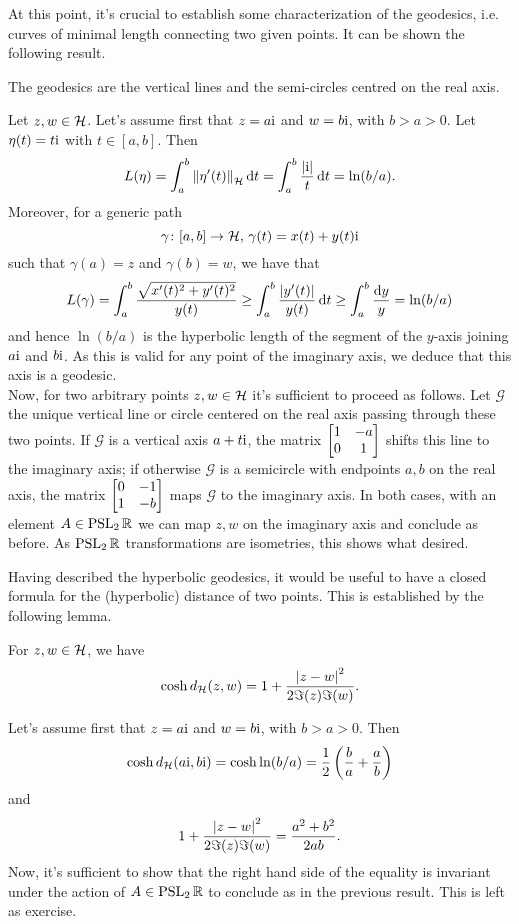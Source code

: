 At this point, it's crucial to establish some characterization of the geodesics, i.e. curves of minimal length connecting two given points. It can be shown the following result.

\begin{nprop}
\label{prop:geod_hyp}
The geodesics are the vertical lines and the semi-circles centred on the real axis.
\end{nprop}
\begin{prf}
Let $z,w\in\mathcal{H}$. Let's assume first that $z=a\mathrm{i}$ and $w=b\mathrm{i}$, with $b>a>0$. Let $\eta(t)=t\mathrm{i}$ with $t\in[a,b]$. Then 
\[
L(\eta)=\int_{a}^{b}\left\lVert \eta'(t)\right\rVert_{\mathcal{H}}\mathop{}\!\mathrm{d} t=\int_{a}^{b}\frac{\left| \mathrm{i}\right|}{t}\mathop{}\!\mathrm{d} t=\ln(b/a).
\]
Moreover, for a generic path 
\[
\gamma\colon[a,b]\to\mathcal{H},\,\gamma(t)=x(t)+y(t)\mathrm{i}
\] 
such that $\gamma(a)=z$ and $\gamma(b)=w$, we have that
\[
L(\gamma)=\int_{a}^{b}\frac{\sqrt{x'(t)^{2}+y'(t)^{2}}}{y(t)}\geq\int_{a}^{b}\frac{\left| y'(t)\right|}{y(t)}\mathop{}\!\mathrm{d} t\geq\int_{a}^{b}\frac{\mathop{}\!\mathrm{d} y}{y}=\ln(b/a)
\]
and hence $\ln(b/a)$ is the hyperbolic length of the segment of the $y$-axis joining $a\mathrm{i}$ and $b\mathrm{i}$. As this is valid for any point of the imaginary axis, we deduce that this axis is a geodesic.\\
Now, for two arbitrary points $z,w\in\mathcal{H}$ it's sufficient to proceed as follows. Let $\mathcal{G}$ the unique vertical line or circle centered on the real axis passing through these two points. If $\mathcal{G}$ is a vertical axis $a+t\mathrm{i}$, the matrix $\begin{bmatrix} 1&-a\\0&1 \end{bmatrix}$ shifts this line to the imaginary axis; if otherwise $\mathcal{G}$ is a semicircle with endpoints $a,b$ on the real axis, the matrix $\begin{bmatrix} 0&-1\\1&-b \end{bmatrix}$ maps $\mathcal{G}$ to the imaginary axis. In both cases, with an element $A\in\operatorname{PSL}_{2}\mathbb{R}$ we can map $z,w$ on the imaginary axis and conclude as before. As $\operatorname{PSL}_{2}\mathbb{R}$ transformations are isometries, this shows what desired.
\end{prf}

Having described the hyperbolic geodesics, it would be useful to have a closed formula for the (hyperbolic) distance of two points. This is established by the following lemma.
\begin{nlem}
\label{lem:hyp_distance_formula}
For $z,w\in\mathcal{H}$, we have 
\[
\cosh d_{\mathcal{H}}(z,w)=1+\frac{\left| z-w\right|^{2}}{2\Im(z)\Im(w)}.
\]
\end{nlem}
\begin{prf}
Let's assume first that $z=a\mathrm{i}$ and $w=b\mathrm{i}$, with $b>a>0$. Then 
\[
\cosh d_{\mathcal{H}}(a\mathrm{i},b\mathrm{i})=\cosh\ln(b/a)=\frac{1}{2}\left(\frac{b}{a}+\frac{a}{b}\right)
\]
and 
\[
1+\frac{\left| z-w\right|^{2}}{2\Im(z)\Im(w)}=\frac{a^{2}+b^{2}}{2ab}.
\]
Now, it's sufficient to show that the right hand side of the equality is invariant under the action of $A\in\operatorname{PSL}_{2}\mathbb{R}$ to conclude as in the previous result. This is left as exercise.
\end{prf}


